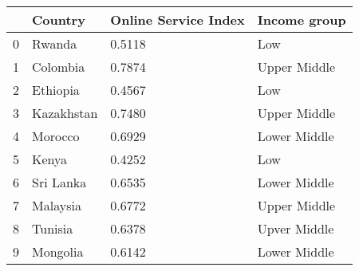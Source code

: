 \begin{tabular}{llll}
\toprule
{} &     Country & Online Service Index &  Income group \\
\midrule
0 &      Rwanda &               0.5118 &           Low \\
1 &    Colombia &               0.7874 &  Upper Middle \\
2 &    Ethiopia &               0.4567 &           Low \\
3 &  Kazakhstan &               0.7480 &  Upper Middle \\
4 &     Morocco &               0.6929 &  Lower Middle \\
5 &       Kenya &               0.4252 &           Low \\
6 &   Sri Lanka &               0.6535 &  Lower Middle \\
7 &    Malaysia &               0.6772 &  Upper Middle \\
8 &     Tunisia &               0.6378 &  Upver Middle \\
9 &    Mongolia &               0.6142 &  Lower Middle \\
\bottomrule
\end{tabular}
